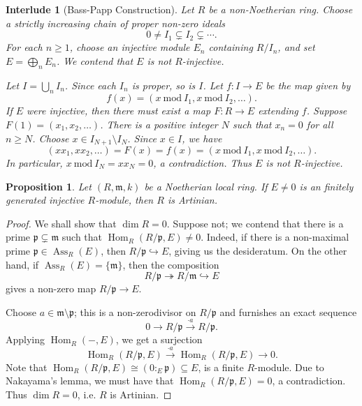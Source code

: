\documentclass[10pt]{article}
\theoremstyle{thmstyle}
\newtheorem{proposition}[theorem]{Proposition}
\theoremstyle{defstyle}
\newtheorem{interlude}[theorem]{Interlude}
\newcommand{\Hom}{\operatorname{Hom}}
\newcommand{\frakm}{\mathfrak{m}} %
\newcommand{\frakp}{\mathfrak{p}} %
\newcommand{\onto}{\twoheadrightarrow}
\newcommand{\into}{\hookrightarrow}
\renewcommand{\mod}{~\mathrm{mod}~}
\renewcommand{\ge}{\geqslant}
\newcommand{\Ass}{\operatorname{Ass}}
\begin{document}
\begin{interlude}[Bass-Papp Construction]
    Let $R$ be a non-Noetherian ring. Choose a strictly increasing chain of proper non-zero ideals 
    \begin{equation*}
        0\ne I_1\subsetneq I_2\subsetneq\cdots.
    \end{equation*}
    For each $n\ge 1$, choose an injective module $E_n$ containing $R/I_n$, and set $E = \bigoplus_n E_n$. We contend that $E$ is not $R$-injective. 

    Let $I = \bigcup_n I_n$. Since each $I_n$ is proper, so is $I$. Let $f: I\to E$ be the map given by 
    \begin{equation*}
        f(x) = \left(x\mod I_1, x\mod I_2, \dots\right).
    \end{equation*}
    If $E$ were injective, then there must exist a map $F: R\to E$ extending $f$. Suppose $F(1) = (x_1, x_2, \dots)$. There is a positive integer $N$ such that $x_n = 0$ for all $n\ge N$. Choose $x\in I_{N + 1}\setminus I_N$. Since $x\in I$, we have 
    \begin{equation*}
        (xx_1, xx_2, \dots) = F(x) = f(x) = \left(x\mod I_1, x\mod I_2, \dots\right).
    \end{equation*}
    In particular, $x\mod I_N = xx_N = 0$, a contradiction. Thus $E$ is not $R$-injective.
\end{interlude}

\begin{proposition}
    Let $(R,\frakm, k)$ be a Noetherian local ring. If $E\ne 0$ is an finitely generated injective $R$-module, then $R$ is Artinian.
\end{proposition}
\begin{proof}
    We shall show that $\dim R = 0$. Suppose not; we contend that there is a prime $\frakp\subsetneq\frakm$ such that $\Hom_{R}\left(R/\frakp, E\right)\ne 0$. Indeed, if there is a non-maximal prime $\frakp\in\Ass_R(E)$, then $R/\frakp\into E$, giving us the desideratum. On the other hand, if $\Ass_R(E) = \{\frakm\}$, then the composition 
    \begin{equation*}
        R/\frakp\onto R/\frakm\into E
    \end{equation*}
    gives a non-zero map $R/\frakp\to E$.

    Choose $a\in\frakm\setminus\frakp$; this is a non-zerodivisor on $R/\frakp$ and furnishes an exact sequence 
    \begin{equation*}
        0\to R/\frakp\xrightarrow{\cdot a} R/\frakp.
    \end{equation*}
    Applying $\Hom_{R}(-, E)$, we get a surjection 
    \begin{equation*}
        \Hom_{R}(R/\frakp, E)\xrightarrow{\cdot a} \Hom_R(R/\frakp, E)\to 0.
    \end{equation*}
    Note that $\Hom_R(R/\frakp, E)\cong (0:_E\frakp)\subseteq E$, is a finite $R$-module. Due to Nakayama's lemma, we must have that $\Hom_R(R/\frakp, E) = 0$, a contradiction. Thus $\dim R = 0$, i.e. $R$ is Artinian.
\end{proof}
\end{document}
